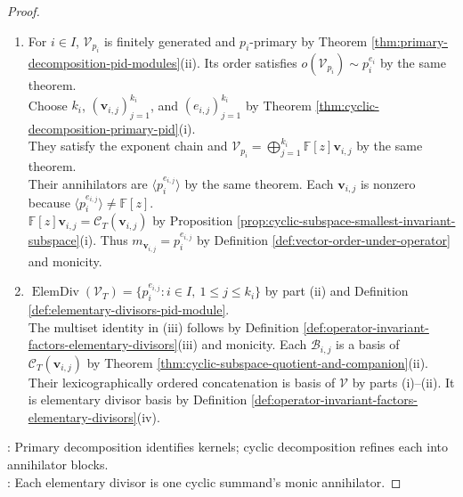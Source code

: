 \begin{theorem}
\begin{proof}
\begin{enumerate}[label=(\roman*)]
Then $M_i$ is the $p_i$-primary component and $\mathcal{V}_T=\bigoplus\limits_{i\in I}M_i$ by Theorem \ref{thm:primary-decomposition-pid-modules}(i).\\
The identity $p_i^{e_i}\cdot\mathbf{v}=p_i(T)^{e_i}\mathbf{v}$ holds by Definition \ref{def:operator-module-and-matrix-module}. Hence $M_i=\ker p_i(T)^{e_i}=\mathcal{V}_{p_i}$.
\item For $i\in I$, $\mathcal{V}_{p_i}$ is finitely generated and $p_i$-primary by Theorem \ref{thm:primary-decomposition-pid-modules}(ii). Its order satisfies $o(\mathcal{V}_{p_i})\sim p_i^{e_i}$ by the same theorem.\\
Choose $k_i$, $(\mathbf{v}_{i,j})_{j=1}^{k_i}$, and $(e_{i,j})_{j=1}^{k_i}$ by Theorem \ref{thm:cyclic-decomposition-primary-pid}(i).\\
They satisfy the exponent chain and $\mathcal{V}_{p_i}=\bigoplus\limits_{j=1}^{k_i}\mathbb{F}[z]\mathbf{v}_{i,j}$ by the same theorem.\\
Their annihilators are $\langle p_i^{e_{i,j}}\rangle$ by the same theorem. Each $\mathbf{v}_{i,j}$ is nonzero because $\langle p_i^{e_{i,j}}\rangle\neq\mathbb{F}[z]$.\\
$\mathbb{F}[z]\mathbf{v}_{i,j}=\mathcal{C}_T(\mathbf{v}_{i,j})$ by Proposition \ref{prop:cyclic-subspace-smallest-invariant-subspace}(i). Thus $m_{\mathbf{v}_{i,j}}=p_i^{e_{i,j}}$ by Definition \ref{def:vector-order-under-operator} and monicity.
\item $\operatorname{ElemDiv}(\mathcal{V}_T)=\{p_i^{e_{i,j}}:i\in I,\ 1\leq j\leq k_i\}$ by part (ii) and Definition \ref{def:elementary-divisors-pid-module}.\\
The multiset identity in (iii) follows by Definition \ref{def:operator-invariant-factors-elementary-divisors}(iii) and monicity. Each $\mathcal{B}_{i,j}$ is a basis of $\mathcal{C}_T(\mathbf{v}_{i,j})$ by Theorem \ref{thm:cyclic-subspace-quotient-and-companion}(ii).\\
Their lexicographically ordered concatenation is basis of $\mathcal{V}$ by parts (i)--(ii). It is elementary divisor basis by Definition \ref{def:operator-invariant-factors-elementary-divisors}(iv).
\end{enumerate}
: Primary decomposition identifies kernels; cyclic decomposition refines each into annihilator blocks.\\
: Each elementary divisor is one cyclic summand's monic annihilator.
\end{proof}
\end{theorem}

